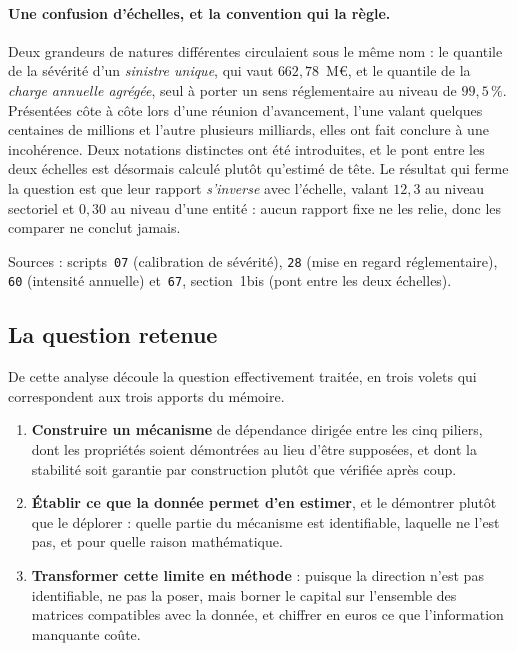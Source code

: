 \documentclass[12pt,a4paper]{article}
\theoremstyle{definition}
\begin{document}
\paragraph{Une confusion d'échelles, et la convention qui la règle.} Deux
grandeurs de natures différentes circulaient sous le même nom : le quantile de la
sévérité d'un \emph{sinistre unique}, qui vaut $662{,}78$~M\euro, et le quantile
de la \emph{charge annuelle agrégée}, seul à porter un sens réglementaire au
niveau de $99{,}5\,\%$. Présentées côte à côte lors d'une réunion d'avancement,
l'une valant quelques centaines de millions et l'autre plusieurs milliards, elles
ont fait conclure à une incohérence. Deux notations distinctes ont été
introduites, et le pont entre les deux échelles est désormais calculé plutôt
qu'estimé de tête. Le résultat qui ferme la question est que leur rapport
\emph{s'inverse} avec l'échelle, valant $12{,}3$ au niveau sectoriel et $0{,}30$
au niveau d'une entité : aucun rapport fixe ne les relie, donc les comparer ne
conclut jamais.

\vspace{4pt}
\noindent Sources : scripts~\texttt{07} (calibration de sévérité), \texttt{28}
(mise en regard réglementaire), \texttt{60} (intensité annuelle) et~\texttt{67},
section~1bis (pont entre les deux échelles).

\subsection{La question retenue}
\label{ss:question}

De cette analyse découle la question effectivement traitée, en trois volets qui
correspondent aux trois apports du mémoire.

\begin{enumerate}[leftmargin=1.5em,itemsep=4pt]
\item \textbf{Construire un mécanisme} de dépendance dirigée entre les cinq
      piliers, dont les propriétés soient démontrées au lieu d'être supposées, et
      dont la stabilité soit garantie par construction plutôt que vérifiée après
      coup.
\item \textbf{Établir ce que la donnée permet d'en estimer}, et le démontrer
      plutôt que le déplorer : quelle partie du mécanisme est identifiable,
      laquelle ne l'est pas, et pour quelle raison mathématique.
\item \textbf{Transformer cette limite en méthode} : puisque la direction n'est
      pas identifiable, ne pas la poser, mais borner le capital sur l'ensemble des
      matrices compatibles avec la donnée, et chiffrer en euros ce que
      l'information manquante coûte.
\end{enumerate}
\end{document}
